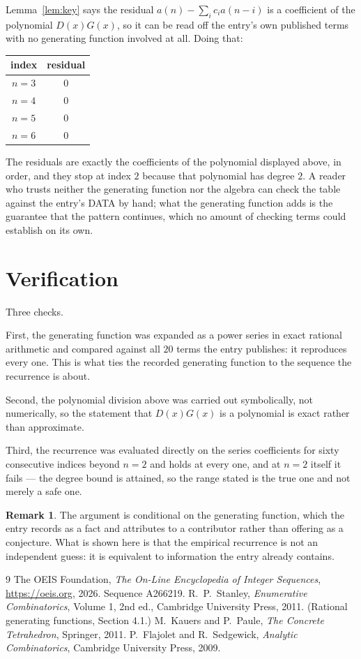 \documentclass[11pt,a4paper]{article}
\theoremstyle{plain}
\theoremstyle{definition}
\newtheorem{remark}[theorem]{Remark}
\begin{document}
Lemma~\ref{lem:key} says the residual $a(n)-\sum_ic_ia(n-i)$ is a coefficient of the
polynomial $D(x)G(x)$, so it can be read off the entry's own published terms with no
generating function involved at all. Doing that:
\begin{center}
\begin{tabular}{cc}
index & residual \\ \hline
$n=3$ & $0$ \\
$n=4$ & $0$ \\
$n=5$ & $0$ \\
$n=6$ & $0$
\end{tabular}
\end{center}
The residuals are exactly the coefficients of the polynomial displayed above, in order, and
they stop at index $2$ because that polynomial has degree $2$. A reader who trusts
neither the generating function nor the algebra can check the table against the entry's DATA
by hand; what the generating function adds is the guarantee that the pattern continues, which
no amount of checking terms could establish on its own.

\section{Verification}

Three checks.

First, the generating function was expanded as a power series in exact rational arithmetic and
compared against all $20$ terms the entry publishes: it reproduces every one. This is
what ties the recorded generating function to the sequence the recurrence is about.

Second, the polynomial division above was carried out symbolically, not numerically, so the
statement that $D(x)G(x)$ is a polynomial is exact rather than approximate.

Third, the recurrence was evaluated directly on the series coefficients for sixty consecutive
indices beyond $n=2$ and holds at every one, and at $n=2$ itself it fails --- the
degree bound is attained, so the range stated is the true one and not merely a safe one.

\begin{remark}
The argument is conditional on the generating function, which the entry records as a fact and
attributes to a contributor rather than offering as a conjecture. What is shown here is that
the empirical recurrence is not an independent guess: it is equivalent to information the
entry already contains.
\end{remark}

\begin{thebibliography}{9}
 The OEIS Foundation, \emph{The On-Line Encyclopedia of Integer
Sequences}, \url{https://oeis.org}, 2026. Sequence A266219.
 R.~P.~Stanley, \emph{Enumerative Combinatorics}, Volume 1, 2nd ed.,
Cambridge University Press, 2011. (Rational generating functions, Section 4.1.)
 M.~Kauers and P.~Paule, \emph{The Concrete Tetrahedron}, Springer, 2011.
 P.~Flajolet and R.~Sedgewick, \emph{Analytic Combinatorics}, Cambridge
University Press, 2009.
\end{thebibliography}
\end{document}
